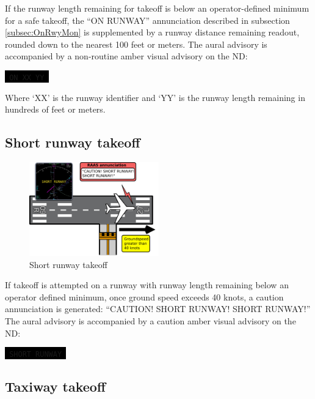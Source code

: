 \documentclass[a4paper,12pt]{article}
\newcommand{\visualadvisory}[3][b]{%
    \ifthenelse{\equal{#1}{b}}{\begin{center}}{}
    \noindent
    \colorbox{black}{\textcolor{#2visualadvisorycolor}{\large\texttt{~#3~}}}
    \ifthenelse{\equal{#1}{b}}{\end{center}}{}}
\begin{document}
If the runway length remaining for takeoff is below an operator-defined
minimum for a safe takeoff, the ``ON RUNWAY'' annunciation described in
subsection \ref{subsec:OnRwyMon} is supplemented by a runway distance
remaining readout, rounded down to the nearest 100 feet or meters. The
aural advisory is accompanied by a non-routine amber visual advisory on
the ND:

\visualadvisory{nonroutine}{ON XX YY}

\noindent Where `XX' is the runway identifier and `YY' is the runway
length remaining in hundreds of feet or meters.

\subsection{Short runway takeoff}
\label{subsec:ShortRwyTakeoffMon}

\begin{figure}
\vspace{-2em}
\begin{center}
\includegraphics[width=0.5\textwidth]{../src/rwy_short_takeoff.pdf}
\end{center}
\caption{Short runway takeoff}
\vspace{-2em}
\end{figure}

If takeoff is attempted on a runway with runway length remaining below an
operator defined minimum, once ground speed exceeds 40 knots, a caution
annunciation is generated: ``CAUTION! SHORT RUNWAY! SHORT RUNWAY!'' The
aural advisory is accompanied by a caution amber visual advisory on the
ND:

\visualadvisory{nonroutine}{SHORT RUNWAY}

\subsection{Taxiway takeoff}
\label{subsec:TwyTakeoffMon}
\end{document}
